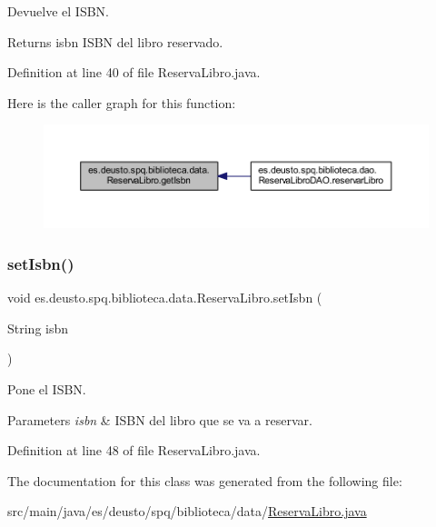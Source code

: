 Devuelve el I\+S\+BN. \begin{DoxyReturn}{Returns}
isbn I\+S\+BN del libro reservado. 
\end{DoxyReturn}


Definition at line 40 of file Reserva\+Libro.\+java.

Here is the caller graph for this function\+:
\nopagebreak
\begin{figure}[H]
\begin{center}
\leavevmode
\includegraphics[width=350pt]{classes_1_1deusto_1_1spq_1_1biblioteca_1_1data_1_1_reserva_libro_afca610a6ce88f886269834aec8ff4832_icgraph}
\end{center}
\end{figure}
\mbox{\label{classes_1_1deusto_1_1spq_1_1biblioteca_1_1data_1_1_reserva_libro_ac4d752a8b40d57f462120856da5661df}} 
\subsubsection{\texorpdfstring{set\+Isbn()}{setIsbn()}}
{\footnotesize\ttfamily void es.\+deusto.\+spq.\+biblioteca.\+data.\+Reserva\+Libro.\+set\+Isbn (\begin{DoxyParamCaption}\item[{String}]{isbn }\end{DoxyParamCaption})}

Pone el I\+S\+BN. 
\begin{DoxyParams}{Parameters}
{\em isbn} & I\+S\+BN del libro que se va a reservar. \\
\hline
\end{DoxyParams}


Definition at line 48 of file Reserva\+Libro.\+java.



The documentation for this class was generated from the following file\+:\begin{DoxyCompactItemize}
\item 
src/main/java/es/deusto/spq/biblioteca/data/\mbox{\hyperlink{_reserva_libro_8java}{Reserva\+Libro.\+java}}\end{DoxyCompactItemize}
